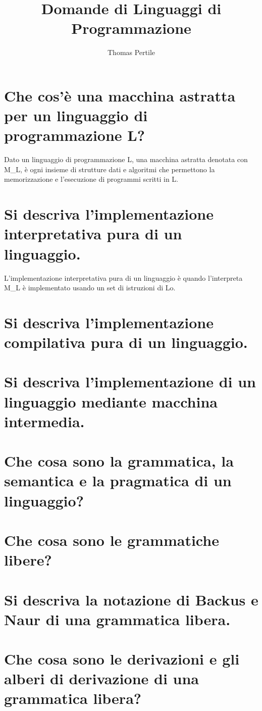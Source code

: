 \documentclass[a4paper, 10pt, italian]{article} %
\author{Thomas Pertile} %
\title{Domande di Linguaggi di Programmazione} %
\begin{document}
\maketitle %

\section{Che cos’\`{e} una macchina astratta per un linguaggio di programmazione L?} %
Dato un linguaggio di programmazione L, una macchina astratta denotata con M_L, \`{e} ogni insieme di strutture dati e algoritmi che permettono la memorizzazione e l'esecuzione di programmi scritti in L. 

\section{Si descriva l’implementazione interpretativa pura di un linguaggio.} %
L'implementazione interpretativa pura di un linguaggio \`{e} quando l'interpreta M_L \`{e} implementato usando un set di istruzioni di Lo.

\section{Si descriva l’implementazione compilativa pura di un linguaggio.}

\section{Si descriva l’implementazione di un linguaggio mediante macchina intermedia.}

\section{Che cosa sono la grammatica, la semantica e la pragmatica di un linguaggio?}

\section{Che cosa sono le grammatiche libere?}

\section{Si descriva la notazione di Backus e Naur di una grammatica libera.}

\section{Che cosa sono le derivazioni e gli alberi di derivazione di una grammatica libera?}
\end{document}
